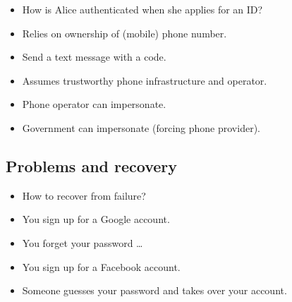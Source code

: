 \begin{frame}
  \begin{exercise}
    \begin{itemize}
      \item How is Alice authenticated when she applies for an ID?
    \end{itemize}
  \end{exercise}
\end{frame}

\begin{frame}
  \begin{example}
    \begin{itemize}
      \item Relies on ownership of (mobile) phone number.
      \item Send a text message with a code.
    \end{itemize}
  \end{example}

  \pause

  \begin{remark}
    \begin{itemize}
      \item Assumes trustworthy phone infrastructure and operator.
      \item Phone operator can impersonate.
      \item Government can impersonate (forcing phone provider).
    \end{itemize}
  \end{remark}
\end{frame}

\subsection{Problems and recovery}

\begin{frame}
  \begin{remark}
    \begin{itemize}
      \item How to recover from failure?
    \end{itemize}
  \end{remark}

  \begin{example}
    \begin{itemize}
      \item You sign up for a Google account.
      \item You forget your password \dots
    \end{itemize}
  \end{example}

  \begin{example}
    \begin{itemize}
      \item You sign up for a Facebook account.
      \item Someone guesses your password and takes over your account.
    \end{itemize}
  \end{example}
\end{frame}

